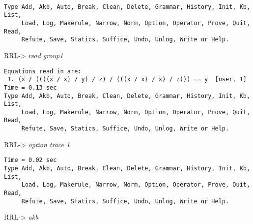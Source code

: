 \small
\tt
\begin{verbatim}
Type Add, Akb, Auto, Break, Clean, Delete, Grammar, History, Init, Kb, List,
     Load, Log, Makerule, Narrow, Norm, Option, Operator, Prove, Quit, Read,
     Refute, Save, Statics, Suffice, Undo, Unlog, Write or Help.
\end{verbatim}
RRL-> {\em read group1}
\begin{verbatim}
Equations read in are:
 1. (x / ((((x / x) / y) / z) / (((x / x) / x) / z))) == y  [user, 1]
Time = 0.13 sec
Type Add, Akb, Auto, Break, Clean, Delete, Grammar, History, Init, Kb, List,
     Load, Log, Makerule, Narrow, Norm, Option, Operator, Prove, Quit, Read,
     Refute, Save, Statics, Suffice, Undo, Unlog, Write or Help.
\end{verbatim}
RRL-> {\em option trace 1}
\begin{verbatim}
Time = 0.02 sec
Type Add, Akb, Auto, Break, Clean, Delete, Grammar, History, Init, Kb, List,
     Load, Log, Makerule, Narrow, Norm, Option, Operator, Prove, Quit, Read,
     Refute, Save, Statics, Suffice, Undo, Unlog, Write or Help.
\end{verbatim}
RRL-> {\em akb}
